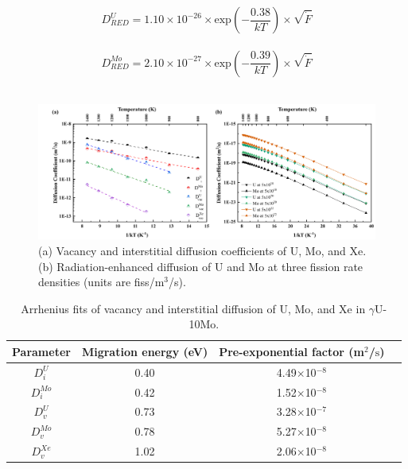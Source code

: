 \documentclass[preprint,12pt]{elsarticle}
\begin{document}
\begin{equation}
D_{RED}^{U}= 1.10\times10^{-26}\times\mbox{exp}(-\frac{0.38}{kT})\times \sqrt{\dot{F}}  
\end{equation}
\\
\begin{equation}
D_{RED}^{Mo}=2.10\times10^{-27}\times \mbox{exp}(-\frac{0.39}{kT})\times \sqrt{\dot{F}} 
\end{equation}
\\
\begin{figure}[hbt!]
\centering
\includegraphics[width=1\textwidth]{Fig4.png}
\caption{(a) Vacancy and interstitial diffusion coefficients of U, Mo, and Xe. (b) Radiation-enhanced diffusion of U and Mo at three fission rate densities (units are fiss/m$^{3}$/s).}
\label{fig:diffcoefficient1}
\end{figure}

\begin{table}[hbt!]
\captionsetup{font=normalsize} 
\caption{Arrhenius fits of vacancy and interstitial diffusion of U, Mo, and Xe in $\gamma$U-10Mo.}
\renewcommand{\arraystretch}{1.2}
\begin{center}
\begin{tabular}{cccc}
\hline
Parameter & Migration energy (eV) & Pre-exponential factor (m$^{2}$/$\mathrm{s}$)  \\ 
\hline
$D^{U}_{i}$ & 0.40 & 4.49$\times$10$^{-8}$ \\  
$D^{Mo}_{i}$& 0.42 & 1.52$\times$10$^{-8}$ \\
$D^{U}_{v}$ & 0.73  & 3.28$\times$10$^{-7}$ \\ 
$D^{Mo}_{v}$& 0.78 & 5.27$\times$10$^{-8}$ \\
$D^{Xe}_{v}$& 1.02 & 2.06$\times$10$^{-8}$ \\
\hline
\end{tabular}
\end{center}
\label{tab:diff1} 
\end{table} 
\end{document}
